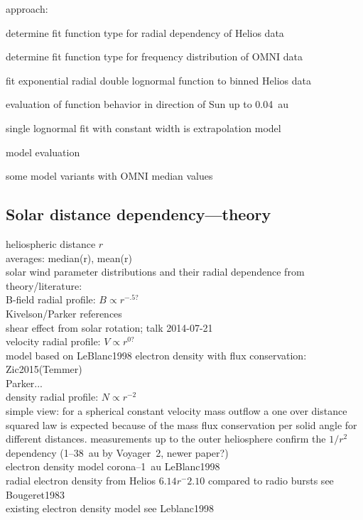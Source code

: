 approach:
\begin{itemize*}
	\item determine fit function type for radial dependency of Helios data
	\item determine fit function type for frequency distribution of OMNI data
	\item fit exponential radial double lognormal function to binned Helios data
	\item evaluation of function behavior in direction of Sun up to 0.04~au
	\item single lognormal fit with constant width is extrapolation model
	\item model evaluation
	\item some model variants with OMNI median values
\end{itemize*}


\subsection{Solar distance dependency---theory}


heliospheric distance $r$\\
averages: median(r), mean(r)\\

solar wind parameter distributions and their radial dependence from theory/literature:\\
B-field radial profile: $B \propto r^{-.5?}$\\
	Kivelson/Parker references\\
	shear effect from solar rotation; talk 2014-07-21\\
velocity radial profile: $V \propto r^{0?}$\\
	model based on LeBlanc1998 electron density with flux conservation: Zic2015(Temmer)\\
	Parker...\\
density radial profile: $N \propto r^{-2}$\\
	simple view: for a spherical constant velocity mass outflow a one over distance squared law is expected because of the mass flux conservation per solid angle for different distances. measurements up to the outer heliosphere confirm the $1/r^2$ dependency (1--38~au by Voyager~2, \citep{Belcher1993} newer paper?)\\
	electron density model corona--1~au LeBlanc1998\\
	radial electron density from Helios $6.14r^-2.10$ compared to radio bursts see Bougeret1983\\%
	existing electron density model see Leblanc1998\\

